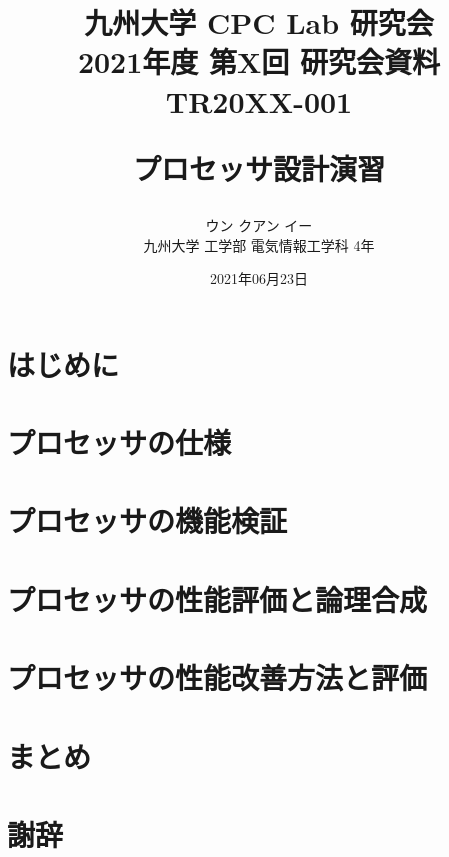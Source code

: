 \documentclass[a4paper, 10pt]{jarticle}
\title{
  \begin{flushright}
    \normalsize{
      九州大学 CPC Lab 研究会  \\
      2021年度 第X回 研究会資料 TR20XX-001
    }
  \end{flushright}
  \Large{\textbf{プロセッサ設計演習}}
}
\author{
    ウン クアン イー\\
    九州大学 工学部 電気情報工学科 4年
}
\date{2021年06月23日}
\begin{document}
  \begin{twocolumn}

  \maketitle

  \section{はじめに}
  

  \section{プロセッサの仕様}
  

  \section{プロセッサの機能検証}
  

  \section{プロセッサの性能評価と論理合成}
  

  \section{プロセッサの性能改善方法と評価}
  

  \section{まとめ}
  

  \section*{謝辞}
  

  
  

\end{twocolumn}
\end{document}
